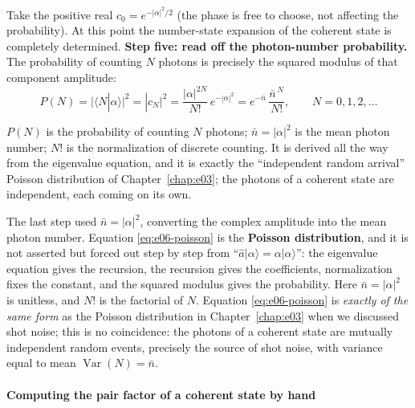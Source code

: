 Take the positive real \(c_0=e^{-|\alpha|^2/2}\) (the phase is free to choose, not affecting the probability). At this point the number-state expansion of the coherent state is completely determined. \textbf{Step five: read off the photon-number probability.} The probability of counting \(N\) photons is precisely the squared modulus of that component amplitude:
\begin{equation}
  P(N)=\big|\langle N|\alpha\rangle\big|^2=|c_N|^2
  =\frac{|\alpha|^{2N}}{N!}\,e^{-|\alpha|^2}
  =e^{-\bar n}\,\frac{\bar n^{\,N}}{N!},
  \qquad N=0,1,2,\dots
  \label{eq:e06-poisson}
\end{equation}
\begin{formulaexplain}
\(P(N)\) is the probability of counting \(N\) photons; \(\bar n=|\alpha|^2\) is the mean photon number; \(N!\) is the normalization of discrete counting. It is derived all the way from the eigenvalue equation, and it is exactly the ``independent random arrival'' Poisson distribution of Chapter~\ref{chap:e03}; the photons of a coherent state are independent, each coming on its own.
\end{formulaexplain}

The last step used \(\bar n=|\alpha|^2\), converting the complex amplitude into the mean photon number. Equation \eqref{eq:e06-poisson} is the \textbf{Poisson distribution}, and it is not asserted but forced out step by step from ``\(\hat a|\alpha\rangle=\alpha|\alpha\rangle\)'': the eigenvalue equation gives the recursion, the recursion gives the coefficients, normalization fixes the constant, and the squared modulus gives the probability. Here \(\bar n=|\alpha|^2\) is unitless, and \(N!\) is the factorial of \(N\). Equation \eqref{eq:e06-poisson} is \emph{exactly of the same form} as the Poisson distribution in Chapter~\ref{chap:e03} when we discussed shot noise; this is no coincidence: the photons of a coherent state are mutually independent random events, precisely the source of shot noise, with variance equal to mean \(\operatorname{Var}(N)=\bar n\).

\paragraph{Computing the pair factor of a coherent state by hand}
\label{sec:e06-coherent-b2}

